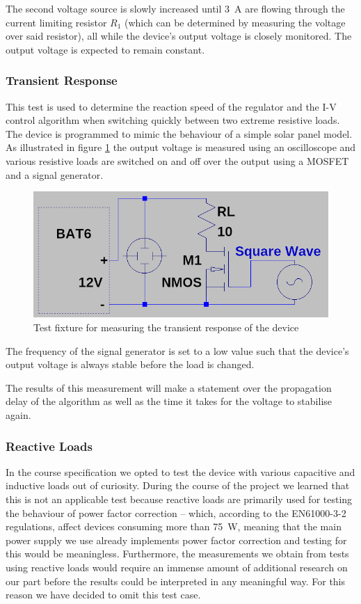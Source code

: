 The second voltage source is slowly increased until \SI{3}{\ampere} are  flowing
through  the  current  limiting  resistor  $R_1$  (which  can  be determined  by
measuring the voltage over said resistor), all while the device's output voltage
is closely monitored. The output voltage is expected to remain constant.


\subsubsection{Transient Response}

This test is used  to  determine  the reaction speed of the regulator and the I-V
control algorithm when switching  quickly  between  two extreme resistive loads.
The device is programmed to mimic  the  behaviour of a simple solar panel model.
As illustrated in figure \ref{fig:verification:transient_fix} the output voltage
is  measured  using  an oscilloscope and various resistive loads are switched on
and off over the output using a MOSFET and a signal generator.

\begin{figure}[th!]
    \centering
    \includegraphics[width=.5\textwidth]{images/sim/transient-fixture.png}
    \caption{Test fixture for measuring the transient response of the device}
    \label{fig:verification:transient_fix}
\end{figure}

The frequency of the signal generator is set  to  a  low  value  such  that  the
device's output voltage is always stable before the load is changed.

The results of this measurement will make a statement over the propagation delay
of  the  algorithm as well as the time it takes for  the  voltage  to  stabilise
again.


\subsubsection{Reactive Loads}

In the course specification we  opted to test the device with various capacitive
and  inductive  loads  out  of  curiosity. During the course of the  project  we
learned that this is not an applicable test because reactive loads are primarily
used for testing the behaviour of power factor correction -- which, according to
the EN61000-3-2  regulations\cite{ref:pfc},  affect  devices consuming more than
\SI{75}{\watt},  meaning  that  the main power supply we use already implements
power factor correction and testing for this would  be meaningless. Furthermore,
the measurements we obtain  from  tests  using  reactive  loads would require an
immense  amount of additional research on our part before the results  could  be
interpreted in any  meaningful way. For this reason we have decided to omit this
test case.


